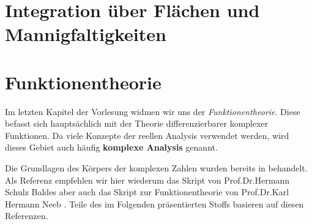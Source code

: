\documentclass[letterpaper,10pt,german]{jupyterBook}
\begin{document}
\chapter{Integration über Flächen und Mannigfaltigkeiten}
\label{\detokenize{surfaceintegrals/surfaceintegrals:integration-uber-flachen-und-mannigfaltigkeiten}}\label{\detokenize{surfaceintegrals/surfaceintegrals::doc}}

\chapter{Funktionentheorie}
\label{\detokenize{complexanalysis/complexanalysis:funktionentheorie}}\label{\detokenize{complexanalysis/complexanalysis::doc}}
\par
Im letzten Kapitel der Vorlesung widmen wir uns der \emph{Funktionentheorie}.
Diese befasst sich hauptsächlich mit der Theorie differenzierbarer komplexer Funktionen.
Da viele Konzepte der reellen Analysis verwendet werden, wird dieses Gebiet auch häufig \textbf{komplexe Analysis} genannt.

\par
Die Grundlagen des Körpers der komplexen Zahlen wurden bereits in \cite{Ten21} behandelt. Als Referenz empfehlen wir hier wiederum das Skript von Prof.Dr.Hermann Schulz Baldes \cite{SB18} aber auch das Skript zur Funktionentheorie von Prof.Dr.Karl Hermann Neeb \cite{Nee17}. Teile des im Folgenden präsentierten Stoffs basieren auf diesen Referenzen.
\end{document}
